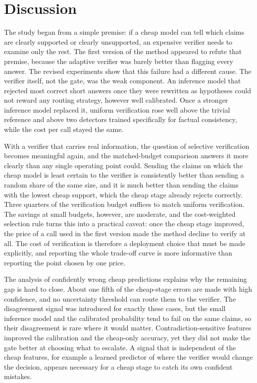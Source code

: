 \documentclass[conference]{IEEEtran}
\begin{document}
\section{Discussion}

The study began from a simple premise: if a cheap model can tell which claims are clearly supported or clearly unsupported, an expensive verifier needs to examine only the rest. The first version of the method appeared to refute that premise, because the adaptive verifier was barely better than flagging every answer. The revised experiments show that this failure had a different cause. The verifier itself, not the gate, was the weak component. An inference model that rejected most correct short answers once they were rewritten as hypotheses could not reward any routing strategy, however well calibrated. Once a stronger inference model replaced it, uniform verification rose well above the trivial reference and above two detectors trained specifically for factual consistency, while the cost per call stayed the same.

With a verifier that carries real information, the question of selective verification becomes meaningful again, and the matched-budget comparison answers it more clearly than any single operating point could. Sending the claims on which the cheap model is least certain to the verifier is consistently better than sending a random share of the same size, and it is much better than sending the claims with the lowest cheap support, which the cheap stage already rejects correctly. Three quarters of the verification budget suffices to match uniform verification. The savings at small budgets, however, are moderate, and the cost-weighted selection rule turns this into a practical caveat: once the cheap stage improved, the price of a call used in the first version made the method decline to verify at all. The cost of verification is therefore a deployment choice that must be made explicitly, and reporting the whole trade-off curve is more informative than reporting the point chosen by one price.

The analysis of confidently wrong cheap predictions explains why the remaining gap is hard to close. About one fifth of the cheap-stage errors are made with high confidence, and no uncertainty threshold can route them to the verifier. The disagreement signal was introduced for exactly these cases, but the small inference model and the calibrated probability tend to fail on the same claims, so their disagreement is rare where it would matter. Contradiction-sensitive features improved the calibration and the cheap-only accuracy, yet they did not make the gate better at choosing what to escalate. A signal that is independent of the cheap features, for example a learned predictor of where the verifier would change the decision, appears necessary for a cheap stage to catch its own confident mistakes.
\end{document}
